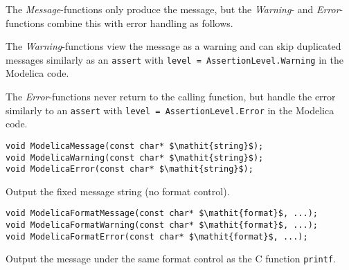 The \emph{Message}-functions only produce the message, but the \emph{Warning}- and \emph{Error}-functions combine this with error handling as follows.

The \emph{Warning}-functions view the message as a warning and can skip duplicated messages similarly as an {\lstinline!assert!} with {\lstinline!level = AssertionLevel.Warning!} in the Modelica code.

The \emph{Error}-functions never return to the calling function, but handle the error similarly to an {\lstinline!assert!} with {\lstinline!level = AssertionLevel.Error!} in the Modelica code.

\begin{functiondefinition*}\label{modelica:ModelicaMessage-et-al}%
\begin{synopsis}[C]\begin{lstlisting}
void ModelicaMessage(const char* $\mathit{string}$);
void ModelicaWarning(const char* $\mathit{string}$);
void ModelicaError(const char* $\mathit{string}$);
\end{lstlisting}\end{synopsis}
\begin{semantics}
Output the fixed message string (no format control).
\end{semantics}
\end{functiondefinition*}

\begin{functiondefinition*}\label{modelica:ModelicaFormatMessage-et-al}%
\begin{synopsis}[C]
\begin{lstlisting}
void ModelicaFormatMessage(const char* $\mathit{format}$, ...);
void ModelicaFormatWarning(const char* $\mathit{format}$, ...);
void ModelicaFormatError(const char* $\mathit{format}$, ...);
\end{lstlisting}\end{synopsis}
\begin{semantics}
Output the message under the same format control as the C function {\lstinline[language=C]!printf!}.
\end{semantics}
\end{functiondefinition*}

